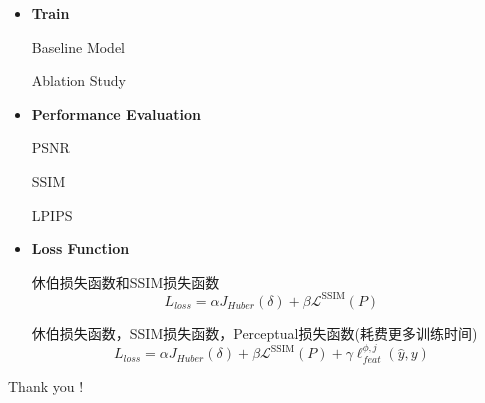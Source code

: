 \documentclass[CJK,aspectratio=169]{beamer}  %
\begin{document}
	\begin{frame}
		\begin{itemize}
			\item \textbf{Train}
			
			\checkmark Baseline Model
			
			\checkmark Ablation Study
		\end{itemize}
		
		\begin{itemize}
			\item \textbf{Performance Evaluation}
			
			
			\checkmark PSNR
			
			\checkmark SSIM
			
			\checkmark LPIPS
		\end{itemize}
		
		\begin{itemize}
			\item \textbf{Loss Function}
			
			\checkmark 休伯损失函数和SSIM损失函数
			\vspace{-.3cm}
				\begin{equation}
					L_{loss} = \alpha J_{Huber}(\delta) + \beta \mathcal{L}^{\text{SSIM}}(P)
				\end{equation}
				
			\checkmark 休伯损失函数，SSIM损失函数，Perceptual损失函数(耗费更多训练时间)
			\vspace{-.3cm}	
				\begin{equation}
					L_{loss} = \alpha J_{Huber}(\delta) + \beta \mathcal{L}^{\text{SSIM}}(P) + \gamma \ell_{feat}^{\phi,j} (\hat{y},y)
				\end{equation}
		\end{itemize}
				
	\end{frame}
	
	
	
	\begin{frame}[plain,c]
		\begin{center}
			\Huge Thank you !
		\end{center}
	\end{frame}
	
%		
%		
	
\end{document}
